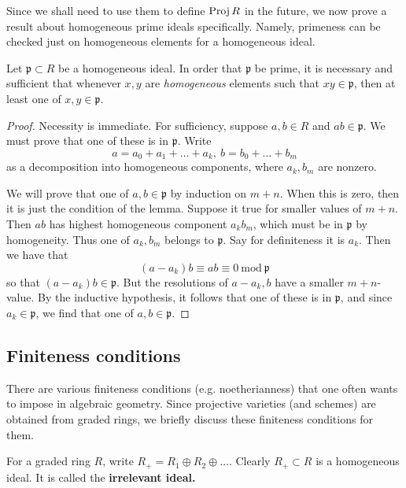Since we shall need to use them to define $\operatorname{Proj} R$ in the future, we now
prove a result about homogeneous prime ideals specifically. Namely, primeness
can be checked just on homogeneous elements for a homogeneous ideal.
\begin{lemma} \label{homogeneousprimeideal}
Let $\mathfrak{p} \subset R$ be a homogeneous ideal. In order that
$\mathfrak{p}$ be prime, it is
necessary and sufficient that whenever $x,y$ are \emph{homogeneous} elements
such that $xy \in \mathfrak{p}$, then at least one of $x,y \in \mathfrak{p}$.
\end{lemma} 
\begin{proof} 
Necessity is immediate. For sufficiency, suppose $a,b  \in R$ and $ab \in
\mathfrak{p}$. We must prove that one of these is in $\mathfrak{p}$. Write 
\[  a = a_0 + a_1  + \dots + a_k,  \ b = b_0 + \dots + b_m  \]
as a decomposition into homogeneous components, where $a_k, b_m$ are nonzero.

We will prove that one of $a,b \in \mathfrak{p}$ by induction on $m+n$. When
this is
zero, then it is just the condition of the lemma.
Suppose it true for smaller values of $m+n$.
Then $ab$ has highest homogeneous component $a_k b_m$, which must be in
$\mathfrak{p}$
by homogeneity.  Thus one of $a_k, b_m$ belongs to $\mathfrak{p}$. Say for
definiteness it is $a_k$. Then we have that
\[  (a-a_k)b \equiv ab \equiv 0 \  \mathrm{mod} \  \mathfrak{p}  \]
so that $(a-a_k)b \in \mathfrak{p}$. But the resolutions of $a-a_k, b$ have a
smaller
$m+n$-value. By the inductive hypothesis, it follows that one of these is in
$\mathfrak{p}$, and since $a_k \in \mathfrak{p}$, we find that one of $a,b \in
\mathfrak{p}$.
\end{proof} 

\subsection{Finiteness conditions}
There are various finiteness conditions (e.g. noetherianness) that one often wants to impose in
algebraic geometry.
Since projective varieties (and schemes) are obtained from graded rings,
we briefly discuss these finiteness conditions for them.

For a graded ring $R$, write $R_+ = R_1 \oplus R_2 \oplus \dots$. Clearly $R_+
\subset R$ is a homogeneous ideal. It is called the \textbf{irrelevant ideal.}

